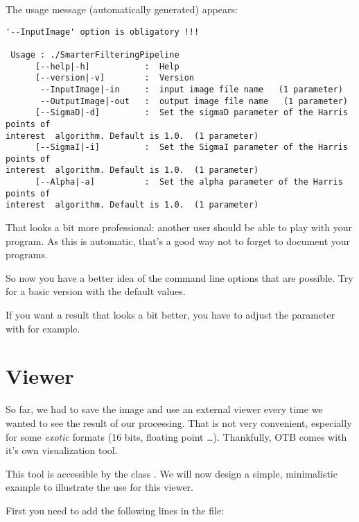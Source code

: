 The usage message (automatically generated) appears:

\begin{small}
\begin{verbatim}
'--InputImage' option is obligatory !!!

 Usage : ./SmarterFilteringPipeline
      [--help|-h]           :  Help
      [--version|-v]        :  Version
       --InputImage|-in     :  input image file name   (1 parameter)
       --OutputImage|-out   :  output image file name   (1 parameter)
      [--SigmaD|-d]         :  Set the sigmaD parameter of the Harris points of
interest  algorithm. Default is 1.0.  (1 parameter)
      [--SigmaI|-i]         :  Set the SigmaI parameter of the Harris points of
interest  algorithm. Default is 1.0.  (1 parameter)
      [--Alpha|-a]          :  Set the alpha parameter of the Harris points of
interest  algorithm. Default is 1.0.  (1 parameter)
\end{verbatim}
\end{small}

That looks a bit more professional: another user should be able to play with
your program. As this is automatic, that's a good way not to forget to
document your programs.

So now you have a better idea of the command line options that are possible. Try
 for a basic
version with the default values.

If you want a result that looks a bit better, you have to adjust the
parameter with  for example.



\section{Viewer}
\label{sec:TutorialViewer}

So far, we had to save the image and use an external viewer every time we wanted
to see the result of our processing. That is not very convenient, especially for
some {\em exotic} formats (16 bits, floating point \ldots). Thankfully, OTB
comes with it's own visualization tool.

This tool is accessible by the class . We will now
design a simple, minimalistic example to illustrate the use for this viewer.

First you need to add the following lines in the  file:

